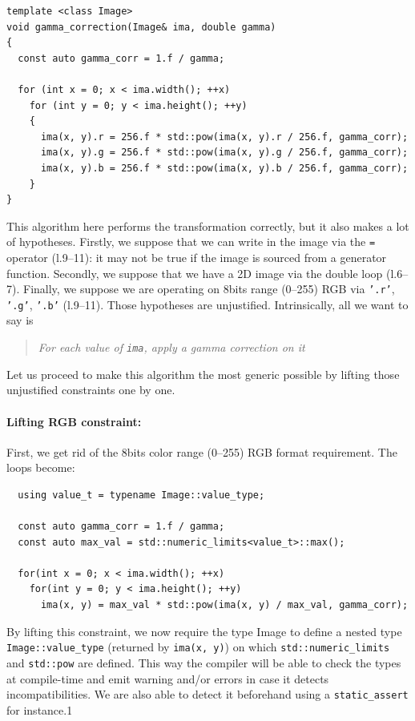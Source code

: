 \begin{verbatim}
template <class Image>
void gamma_correction(Image& ima, double gamma)
{
  const auto gamma_corr = 1.f / gamma;

  for (int x = 0; x < ima.width(); ++x)
    for (int y = 0; y < ima.height(); ++y)
    {
      ima(x, y).r = 256.f * std::pow(ima(x, y).r / 256.f, gamma_corr);
      ima(x, y).g = 256.f * std::pow(ima(x, y).g / 256.f, gamma_corr);
      ima(x, y).b = 256.f * std::pow(ima(x, y).b / 256.f, gamma_corr);
    }
}
\end{verbatim}

\noindent This algorithm here performs the transformation correctly, but it also makes a lot of hypotheses. Firstly, we
suppose that we can write in the image via the \texttt{=} operator (l.9--11): it may not be true if the image is sourced
from a generator function. Secondly, we suppose that we have a 2D image via the double loop (l.6--7). Finally, we
suppose we are operating on 8bits range (0--255) RGB via \texttt{'.r'}, \texttt{'.g'}, \texttt{'.b'} (l.9--11). Those
hypotheses are unjustified. Intrinsically, all we want to say is \blockquote{\emph{For each value of \texttt{ima}, apply
    a gamma correction on it}}. Let us proceed to make this algorithm the most generic possible by lifting those unjustified
constraints one by one.



\paragraph{Lifting RGB constraint:}
First, we get rid of the 8bits color range (0--255) RGB format requirement. The loops become:

\begin{verbatim}
  using value_t = typename Image::value_type;

  const auto gamma_corr = 1.f / gamma;
  const auto max_val = std::numeric_limits<value_t>::max();

  for(int x = 0; x < ima.width(); ++x)
    for(int y = 0; y < ima.height(); ++y)
      ima(x, y) = max_val * std::pow(ima(x, y) / max_val, gamma_corr);
\end{verbatim}

\noindent By lifting this constraint, we now require the type Image to define a nested type\\
\texttt{Image::value\_type} (returned by \texttt{ima(x, y)}) on which \texttt{std::numeric\_limits} and
\texttt{std::pow} are defined. This way the compiler will be able to check the types at compile-time and emit warning
and/or errors in case it detects incompatibilities. We are also able to detect it beforehand using a
\texttt{static\_assert} for instance.1



